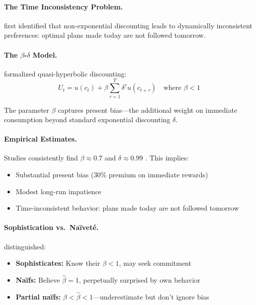 \paragraph{The Time Inconsistency Problem.}
\citet{strotz1956} first identified that non-exponential discounting leads to
dynamically inconsistent preferences: optimal plans made today are not followed tomorrow.

\paragraph{The $\beta$-$\delta$ Model.}
\citet{laibson1997} formalized quasi-hyperbolic discounting:
\begin{equation}
  U_t = u(c_t) + \beta \sum_{\tau=1}^{T} \delta^\tau u(c_{t+\tau}) 
  \quad \text{where } \beta < 1
  \label{eq:beta-delta}
\end{equation}

The parameter $\beta$ captures present bias---the additional weight on immediate
consumption beyond standard exponential discounting $\delta$.

\paragraph{Empirical Estimates.}
Studies consistently find $\beta \approx 0.7$ and $\delta \approx 0.99$
\citep{frederick2002time,cohen2020measuring}. This implies:
\begin{itemize}
  \item Substantial present bias (30\% premium on immediate rewards)
  \item Modest long-run impatience
  \item Time-inconsistent behavior: plans made today are not followed tomorrow
\end{itemize}

\paragraph{Sophistication vs.\ Naïveté.}
\citet{odonoghue1999,odonoghue2001} distinguished:
\begin{itemize}
  \item \textbf{Sophisticates:} Know their $\beta < 1$, may seek commitment
  \item \textbf{Naïfs:} Believe $\hat{\beta} = 1$, perpetually surprised by own behavior
  \item \textbf{Partial naïfs:} $\beta < \hat{\beta} < 1$---underestimate but don't ignore bias
\end{itemize}

